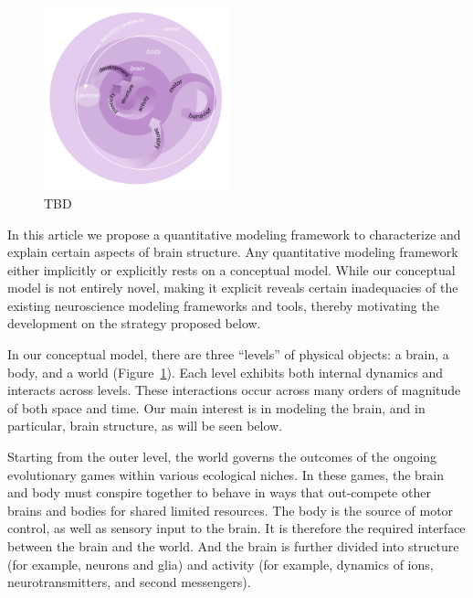 \documentclass[11pt]{article}
\begin{document}
\begin{figure}
  \begin{center}
    \includegraphics[width=0.48\textwidth]{figs/brain-body-world.pdf}
  \end{center}
  \caption{TBD
  }
	\label{f:code}
\end{figure}

In this article we propose a quantitative modeling framework to characterize and explain certain aspects of brain structure.  Any quantitative modeling framework either implicitly or explicitly rests on a conceptual model. While our conceptual model is not entirely novel, making it explicit reveals certain inadequacies of the existing neuroscience modeling frameworks and tools, thereby motivating the development on the strategy proposed below.

In our conceptual model, there are three ``levels'' of physical objects: a brain, a body, and a world (Figure~\ref{f:code}).  Each level exhibits both internal dynamics and interacts across levels.  These interactions occur across many orders of magnitude of both space and time.  
Our main interest is in modeling the brain, and in particular, brain structure, as will be seen below.

Starting from the outer level, the world governs the outcomes of the ongoing evolutionary games within various ecological niches.  In these games, the brain and body must conspire together to behave in ways that out-compete other brains and bodies for shared limited resources.  The body is the source of motor control, as well as sensory input to the brain.  It is therefore the required interface between the brain and the world.  And the brain is further divided into structure (for example, neurons and glia) and activity (for example, dynamics of ions, neurotransmitters, and second messengers).  
\end{document}
